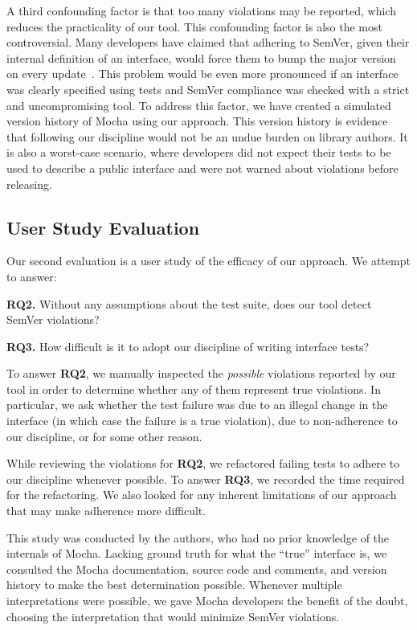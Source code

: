A third confounding factor is that too many violations may be
reported, which reduces the practicality of our tool. This confounding
factor is also the most controversial. Many developers have claimed
that adhering to SemVer, given their internal definition of an
interface, would force them to bump the major version on every
update~\cite{backbone-2888,exoplayer-1382,crawford-not-semver}. This
problem would be even more pronounced if an interface was clearly
specified using tests and SemVer compliance was checked with a strict
and uncompromising tool. To address this factor, we have created a
simulated version history of Mocha using our approach. This version
history is evidence that following our discipline would not be an
undue burden on library authors. It is also a worst-case scenario,
where developers did not expect their tests to be used to describe a
public interface and were not warned about violations before
releasing.

\subsection{User Study Evaluation}
Our second evaluation is a user study of the efficacy of our
approach. We attempt to answer: 

{\bf RQ2.} Without any assumptions about the test suite, does our tool
detect SemVer violations?

{\bf RQ3.} How difficult is it to adopt our discipline of writing interface
tests?

To answer {\bf RQ2}, we manually inspected the {\em possible} 
violations reported by our tool in order to determine whether any of
them represent true violations. In particular, we ask whether the test
failure was due to an illegal change in the interface (in which case
the failure is a true violation), due to non-adherence to our
discipline, or for some other reason.

While reviewing the violations for {\bf RQ2}, we refactored failing
tests to adhere to our discipline whenever possible. To answer {\bf
  RQ3}, we recorded the time required for the refactoring. We also
looked for any inherent limitations of our approach that may make
adherence more difficult.

This study was conducted by the authors, who had no prior knowledge of
the internals of Mocha. Lacking ground truth for what the ``true''
interface is, we consulted the Mocha documentation, source code and
comments, and version history to make the best determination
possible. Whenever multiple interpretations were possible, we gave
Mocha developers the benefit of the doubt, choosing the interpretation
that would minimize SemVer violations.

